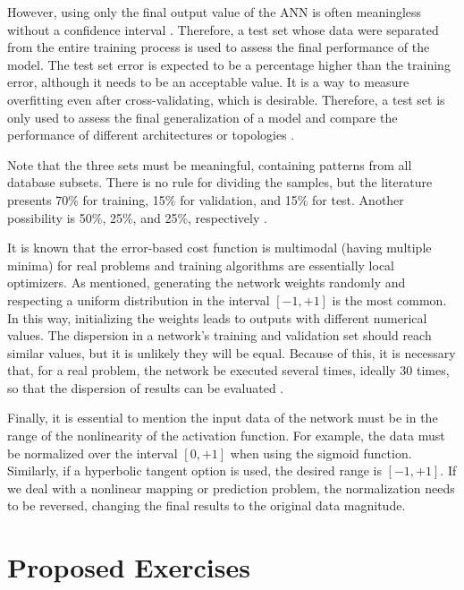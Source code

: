 However, using only the final output value of the ANN is often meaningless without a confidence interval \cite{Kohavi1995}. Therefore, a test set whose data were separated from the entire training process is used to assess the final performance of the model. The test set error is expected to be a percentage higher than the training error, although it needs to be an acceptable value. It is a way to measure overfitting even after cross-validating, which is desirable. Therefore, a test set is only used to assess the final generalization of a model and compare the performance of different architectures or topologies \cite{Ripley2005}.

Note that the three sets must be meaningful, containing patterns from all database subsets. There is no rule for dividing the samples, but the literature presents 70\% for training, 15\% for validation, and 15\% for test. Another possibility is 50\%, 25\%, and 25\%, respectively \cite{haykin}.

It is known that the error-based cost function is multimodal (having multiple minima) for real problems and training algorithms are essentially local optimizers. As mentioned, generating the network weights randomly and respecting a uniform distribution in the interval $[-1,+1]$ is the most common. In this way, initializing the weights leads to outputs with different numerical values. The dispersion in a network's training and validation set should reach similar values, but it is unlikely they will be equal. Because of this, it is necessary that, for a real problem, the network be executed several times, ideally 30 times, so that the dispersion of results can be evaluated \cite{demvsar2006statistical}. 

Finally, it is essential to mention the input data of the network must be in the range of the nonlinearity of the activation function. For example, the data must be normalized over the interval $[0,+1]$ when using the sigmoid function. Similarly, if a hyperbolic tangent option is used, the desired range is $[-1,+1]$. If we deal with a nonlinear mapping or prediction problem, the normalization needs to be reversed, changing the final results to the original data magnitude.

\section{Proposed Exercises}
\label{ssec:exercises}

